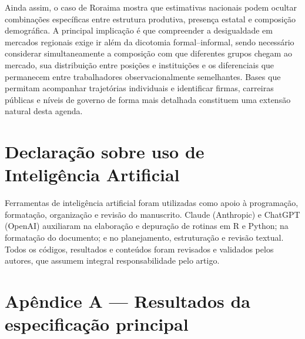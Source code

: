 \documentclass[12pt]{article}
\begin{document}
Ainda assim, o caso de Roraima mostra que estimativas nacionais podem ocultar
combinações específicas entre estrutura produtiva, presença estatal e
composição demográfica. A principal implicação é que compreender a desigualdade
em mercados regionais exige ir além da dicotomia formal--informal, sendo necessário
considerar simultaneamente a composição com que diferentes grupos chegam ao
mercado, sua distribuição entre posições e instituições e os diferenciais que
permanecem entre trabalhadores observacionalmente semelhantes. Bases que
permitam acompanhar trajetórias individuais e identificar firmas, carreiras
públicas e níveis de governo de forma mais detalhada constituem uma extensão
natural desta agenda.

\begingroup
\footnotesize
\section{Declaração sobre uso de Inteligência Artificial}

Ferramentas de inteligência artificial foram utilizadas como apoio à programação, 
formatação, organização e revisão do manuscrito. Claude (Anthropic) e ChatGPT
(OpenAI) auxiliaram na elaboração e depuração de rotinas em R e Python; na formatação 
do documento; e no planejamento, estruturação e revisão textual. 
Todos os códigos, resultados e conteúdos foram revisados e validados pelos autores, 
que assumem integral responsabilidade pelo artigo.

\endgroup

\begingroup
\small


\endgroup

\appendix
\renewcommand{\thetable}{A\arabic{table}}
\renewcommand{\theHtable}{A.\arabic{table}}
\setcounter{table}{0}
\section*{Apêndice A --- Resultados da especificação principal}
\label{sec:apendice}
\end{document}
